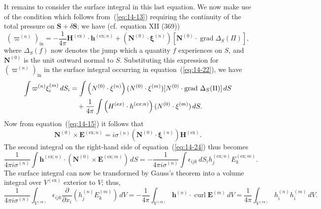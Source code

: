 It remains to consider the surface integral in this last equation. We now make use of the condition which follows from~(\ref{eq:14-13}) requiring the continuity of the total pressure on $\mathbf{S} + \delta \mathbf{S}$; we have (cf.\ equation XII (369))
\begin{equation}
\label{eq:14-23}
(\varpi^{(n)})_{\mathrm{in}} = -\frac{1}{4\pi} \mathbf{H}^{(\mathrm{ex})} \cdot \mathbf{h}^{(\mathrm{ex};n)} + (\mathbf{N}^{(0)} \cdot \boldsymbol{\xi}^{(n)})[\mathbf{N}^{(0)} \cdot \operatorname{grad} \Delta_S(\Pi)],
\end{equation}
where $\Delta_S(f)$ now denotes the jump which a quantity $f$ experiences on $S$, and $\mathbf{N}^{(0)}$ is the unit outward normal to $S$. Substituting this expression for $(\varpi^{(n)})_{\mathrm{in}}$ in the surface integral occurring in equation~(\ref{eq:14-22}), we have
\begin{align}
\label{eq:14-24}
\int \varpi^{(n)} \xi_i^{(m)} \, dS_i &= \int \left(\mathbf{N}^{(0)} \cdot \boldsymbol{\xi}^{(n)}\right) (\mathbf{N}^{(0)} \cdot \boldsymbol{\xi}^{(m)}) [\mathbf{N}^{(0)} \cdot \operatorname{grad}\, \Delta_S(\Pi)] \, dS \notag \\
&\quad + \frac{1}{4\pi} \int \left(\mathbf{H}^{(\mathrm{ex})} \cdot \mathbf{h}^{(\mathrm{ex};n)}\right) (\mathbf{N}^{(0)} \cdot \boldsymbol{\xi}^{(m)}) \, dS.
\end{align}
Now from equation~(\ref{eq:14-15}) it follows that
\begin{equation}
\label{eq:14-25}
\mathbf{N}^{(0)} \times \mathbf{E}^{(\mathrm{ex};n)} = i\sigma^{(n)} (\mathbf{N}^{(0)} \cdot \boldsymbol{\xi}^{(n)}) \mathbf{H}^{(\mathrm{ex})}.
\end{equation}
The second integral on the right-hand side of equation~(\ref{eq:14-24}) thus becomes
\begin{equation}
\label{eq:14-26}
\frac{1}{4\pi i \sigma^{(n)}} \int \mathbf{h}^{(\mathrm{ex};n)} \cdot (\mathbf{N}^{(0)} \times \mathbf{E}^{(\mathrm{ex};m)}) \, dS = -\frac{1}{4\pi i \sigma^{(n)}} \int \epsilon_{ijk} \, dS_i h_j^{(\mathrm{ex};n)} E_k^{(\mathrm{ex};m)}.
\end{equation}
The surface integral can now be transformed by Gauss's theorem into a volume integral over $V^{(\mathrm{ex})}$ exterior to $V$; thus,
\begin{equation}
\label{eq:14-27}
\frac{1}{4\pi i \sigma^{(n)}} \int_{V^{(\mathrm{ex})}} \epsilon_{ijk} \frac{\partial}{\partial x_i} (h_j^{(n)} E_k^{(m)}) \, dV
= -\frac{1}{4\pi} \int_{V^{(\mathrm{ex})}} \mathbf{h}^{(n)} \cdot \operatorname{curl} \mathbf{E}^{(m)} \, dV = \frac{1}{4\pi} \int_{V^{(\mathrm{ex})}} h_i^{(n)} h_i^{(m)} \, dV.
\end{equation}

